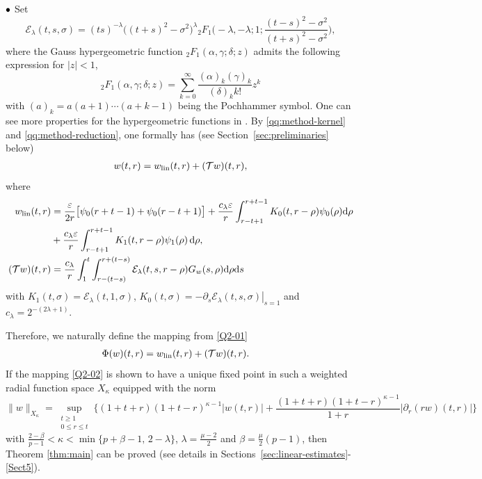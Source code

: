 \documentclass[11pt,twoside]{article}
\newcommand{\p}{\partial}
\newcommand{\ve}{\varepsilon}
\newcommand{\f}{\frac}
\newcommand{\Ecal}{\mathcal E}
\newcommand{\Tcal}{\mathcal T}
\theoremstyle{plain}
\theoremstyle{definition}
\theoremstyle{remark}
\numberwithin{equation}{section}
\begin{document}
\medskip


${\bf \bullet}$ Set
\begin{equation}
\label{qq:method-kernel}
\Ecal_\lambda(t,s,\sigma)
=(ts)^{-\lambda}\bigl((t+s)^2-\sigma^2\bigr)^\lambda
{}_2F_1\big(-\lambda,-\lambda;1;
\f{(t-s)^2-\sigma^2}{(t+s)^2-\sigma^2}\big),
\end{equation}
where the Gauss hypergeometric function ${}_2F_1(\alpha,\gamma;\delta;z)$ admits the following expression for $|z|<1$,
\[
{}_2F_1(\alpha,\gamma;\delta;z)
=\sum_{k=0}^{\infty}\f{(\alpha)_k(\gamma)_k}{(\delta)_k k!}z^k
\]
with $(a)_k=a(a+1)\cdots(a+k-1)$ being the Pochhammer symbol. One can see more properties for  the
hypergeometric functions in \cite[Section~15]{OLBC}. By
\eqref{qq:method-kernel} and \eqref{qq:method-reduction}, one formally has (see Section~\ref{sec:preliminaries} below)
\begin{equation}
\label{Q2-01}
\begin{aligned}
w(t,r)=w_{\rm lin}(t,r)+(\Tcal w)(t,r),
\end{aligned}
\end{equation}
where
\begin{equation*}
\label{Q2-001}
\begin{aligned}
w_{\rm lin}(t,r)&={}\f{\ve}{2r}
\bigl[\psi_0(r+t-1)+\psi_0(r-t+1)\bigr]
+\f{c_\lambda\ve}{r}
\int_{r-t+1}^{r+t-1}
K_0(t,r-\rho)\psi_0(\rho)\mathrm d\rho
\\
&+\f{c_\lambda\ve}{r}
\int_{r-t+1}^{r+t-1}
K_1(t,r-\rho)\psi_1(\rho)\,\mathrm d\rho,\\
(\Tcal w)(t,r)&=\f{c_\lambda}{r}
\int_1^t\int_{r-(t-s)}^{r+(t-s)}
\Ecal_\lambda(t,s,r-\rho)G_w(s,\rho)\mathrm d\rho\mathrm ds\\
\end{aligned}
\end{equation*}
with $K_1(t,\sigma)=\Ecal_\lambda(t,1,\sigma)$, $K_0(t,\sigma)=
-\left.\p_s\Ecal_\lambda(t,s,\sigma)\right|_{s=1}$ and $c_\lambda=2^{-(2\lambda+1)}$.

Therefore, we naturally define the mapping from \eqref{Q2-01}
\begin{equation}
\label{Q2-02}
\begin{aligned}
\Phi(w)(t,r)={}&w_{\rm lin}(t,r)+(\Tcal w)(t,r).
\end{aligned}
\end{equation}
If the mapping \eqref{Q2-02} is shown to have a unique fixed point in such a weighted radial function space
$X_\kappa$ equipped with the norm
\begin{equation}
\label{qq:method-space}
\|w\|_{X_\kappa}
=
\sup_{\substack{t\geq1\\0\leq r\leq t}}
\big\{
(1+t+r)(1+t-r)^{\kappa-1}|w(t,r)|
+
\f{(1+t+r)(1+t-r)^{\kappa-1}}{1+r}
|\p_r(rw)(t,r)|
\big\}
\end{equation}
with $\f{2-\beta}{p-1}
<\kappa<\min\{p+\beta-1,\,2-\lambda\}$, $\lambda=\f{\mu-2}{2}$ and $\beta=\f{\mu}{2}(p-1)$,
then Theorem \ref{thm:main} can be proved (see details in Sections~\ref{sec:linear-estimates}-
\ref{Sect5}).
\end{document}
